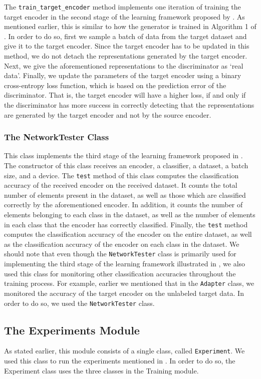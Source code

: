 \documentclass[14pt]{extarticle}
\begin{document}
		The \texttt{train\_target\_encoder} method implements one iteration of training the target encoder in the second stage of the learning framework proposed by \cite{adda}. As mentioned earlier, this is similar to how the generator is trained in Algorithm 1 of \cite{gan}. In order to do so, first we sample a batch of data from the target dataset and give it to the target encoder. Since the target encoder has to be updated in this method, we do not detach the representations generated by the target encoder. Next, we give the aforementioned representations to the discriminator as `real data'. Finally, we update the parameters of the target encoder using a binary cross-entropy loss function, which is based on the prediction error of the discriminator. That is, the target encoder will have a higher loss, if and only if the discriminator has more success in correctly detecting that the representations are generated by the target encoder and not by the source encoder.
		\subsubsection{The NetworkTester Class}
		This class implements the third stage of the learning framework proposed in \cite{adda}. The constructor of this class receives an encoder, a classifier, a dataset, a batch size, and a device. The \texttt{test} method of this class computes the classification accuracy of the received encoder on the received dataset. It counts the total number of elements present in the dataset, as well as those which are classified correctly by the aforementioned encoder. In addition, it counts the number of elements belonging to each class in the dataset, as well as the number of elements in each class that the encoder has correctly classified. Finally, the \texttt{test} method computes the classification accuracy of the encoder on the entire dataset, as well as the classification accuracy of the encoder on each class in the dataset. We should note that even though the \texttt{NetworkTester} class is primarily used for implementing the third stage of the learning framework illustrated in \cite{adda}, we  also used this class for monitoring other classification accuracies throughout the training process. For example, earlier we mentioned that in the \texttt{Adapter} class, we monitored the accuracy of the target encoder on the unlabeled target data. In order to do so, we used the \texttt{NetworkTester} class.
		\subsection{The Experiments Module}
		As stated earlier, this module consists of a single class, called \texttt{Experiment}. We used this class to run the experiments mentioned in \cite{adda}. In order to do so, the Experiment class uses the three classes in the Training module.
\end{document}
